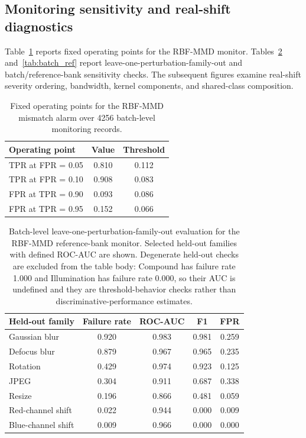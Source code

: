 \documentclass[a4paper,fleqn]{els-cas-templates/cas-sc}
\begin{document}
\subsection{Monitoring sensitivity and real-shift diagnostics}

Table~\ref{tab:mmd_oppoints} reports fixed operating points for the RBF-MMD
monitor. Tables~\ref{tab:lopo} and~\ref{tab:batch_ref} report
leave-one-perturbation-family-out and batch/reference-bank sensitivity checks.
The subsequent figures examine real-shift severity ordering, bandwidth, kernel
components, and shared-class composition.

\begin{table}[pos=htbp]
\centering
\caption{Fixed operating points for the RBF-MMD mismatch alarm over 4256
batch-level monitoring records.}
\label{tab:mmd_oppoints}
\small
\begin{tabular}{lcc}
\toprule
Operating point & Value & Threshold \\
\midrule
TPR at FPR = 0.05 & 0.810 & 0.112 \\
TPR at FPR = 0.10 & 0.908 & 0.083 \\
FPR at TPR = 0.90 & 0.093 & 0.086 \\
FPR at TPR = 0.95 & 0.152 & 0.066 \\
\bottomrule
\end{tabular}
\end{table}

\begin{table}[pos=htbp]
\centering
\caption{Batch-level leave-one-perturbation-family-out evaluation for the
RBF-MMD reference-bank monitor. Selected held-out families with defined
ROC-AUC are shown. Degenerate held-out checks are excluded from the table body:
Compound has failure rate 1.000 and Illumination has failure rate 0.000, so
their AUC is undefined and they are threshold-behavior checks rather than
discriminative-performance estimates.}
\label{tab:lopo}
\small
\begin{tabular}{lcccc}
\toprule
Held-out family & Failure rate & ROC-AUC & F1 & FPR \\
\midrule
Gaussian blur & 0.920 & 0.983 & 0.981 & 0.259 \\
Defocus blur & 0.879 & 0.967 & 0.965 & 0.235 \\
Rotation & 0.429 & 0.974 & 0.923 & 0.125 \\
JPEG & 0.304 & 0.911 & 0.687 & 0.338 \\
Resize & 0.196 & 0.866 & 0.481 & 0.059 \\
Red-channel shift & 0.022 & 0.944 & 0.000 & 0.009 \\
Blue-channel shift & 0.009 & 0.966 & 0.000 & 0.000 \\
\bottomrule
\end{tabular}
\end{table}
\end{document}
